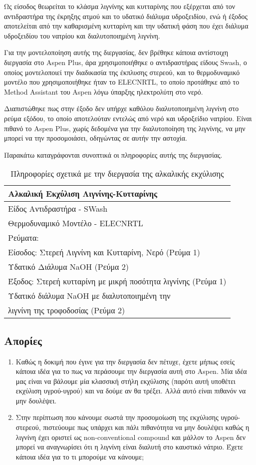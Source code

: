 \documentclass[11pt]{article}
\begin{document}
Ως είσοδος θεωρείται το κλάσμα λιγνίνης και κυτταρίνης που εξέρχεται από
τον αντιδραστήρα της έκρηξης ατμού και το υδατικό διάλυμα υδροξειδίου,
ενώ ή έξοδος αποτελείται από την καθαρισμένη κυτταρίνη και την υδατική φάση που έχει διάλυμα υδροξειδίου του νατρίου και διαλυτοποιημένη λιγνίνη.  

Για την μοντελοποίηση αυτής της διεργασίας, δεν βρέθηκε κάποια
αντίστοιχη διεργασία στο Aspen Plus, άρα χρησιμοποιήθηκε ο αντιδραστήρας
είδους Swash, ο οποίος μοντελοποιεί την διαδικασία της έκπλυσης στερεού,
και το θερμοδυναμικό μοντέλο που χρησιμοποιήθηκε ήταν το ELECNRTL, το
οποίο προτάθηκε από το Method Assistant του Aspen λόγω ύπαρξης
ηλεκτρολύτη στο νερό.

Διαπιστώθηκε πως στην έξοδο δεν υπήρχε καθόλου διαλυτοποιημένη λιγνίνη
στο ρεύμα εξόδου, το οποίο αποτελούταν εντελώς από νερό και υδροξείδιο
νατρίου. Είναι πιθανό το Aspen Plus, χωρίς δεδομένα για την
διαλυτοποίηση της λιγνίνης, να μην μπορεί να την προσομοιάσει, οδηγώντας
σε αυτήν την αστοχία.

Παρακάτω καταγράφονται συνοπτικά οι πληροφορίες αυτής της διεργασίας.

\begin{table}[htbp]
\caption{Πληροφορίες σχετικά με την διεργασία της αλκαλικής εκχύλισης}
\centering
\begin{tabular}{l}
\hline
Αλκαλική Εκχύλιση Λιγνίνης-Κυτταρίνης\\
\hline
Είδος Αντιδραστήρα - SWash\\
Θερμοδυναμικό Μοντέλο - ELECNRTL\\
Ρεύματα:\\
\hline
Είσοδος: Στερεή Λιγνίνη και Κυτταρίνη, Νερό (Ρεύμα 1)\\
Υδατικό Διάλυμα NaOH (Ρεύμα 2)\\
\hline
Έξοδος: Στερεή κυτταρίνη με μικρή ποσότητα λιγνίνης (Ρεύμα 1)\\
Υδατικό διάλυμα NaOH με διαλυτοποιημένη την\\
λιγνίνη της τροφοδοσίας (Ρεύμα 2)\\
\hline
\end{tabular}
\end{table}

\subsection{Απορίες}
\label{sec:org871f58b}
\begin{enumerate}
\item Καθώς η δοκιμή που έγινε για την διεργασία δεν πέτυχε, έχετε μήπως εσείς κάποια ιδέα για το πως να περάσουμε την διεργασία αυτή στο Aspen. Μία ιδέα μας είναι να βάλουμε μία κλασσική στήλη εκχύλισης (παρότι αυτή υποθέτει εκχύλιση υγρού-υγρού) και να δούμε αν θα τρέξει. Αλλά αυτό είναι πιθανόν να μην δουλέψει.
\item Στην περίπτωση που κάνουμε σωστά την προσομοίωση της εκχύλισης υγρού-στερεού, πιστεύουμε πως υπάρχει και πάλι πιθανότητα να μην δουλέψει καθώς η λιγνίνη έχει οριστεί ως non-conventional compound και μάλλον το Aspen δεν μπορεί να αναγνωρίσει ότι η λιγνίνη είναι διαλυτή στο καυστικό νάτριο. Έχετε κάποια ιδέα για το τι μπορούμε να κάνουμε;
\end{enumerate}
\end{document}
